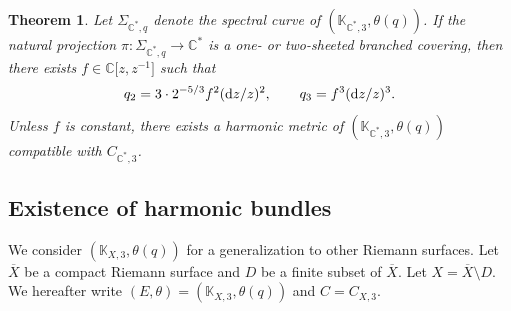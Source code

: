 \documentclass[10pt,a4paper]{amsart}
\numberwithin{equation}{section}
\newtheorem{Theorem}{Theorem}[section]
\newcommand{\C}{\mathbb{C}}
\begin{document}
\begin{Theorem}\label{main_Cstar'}
 Let $\Sigma_{\C^*,q}$ denote the spectral curve of $(\mathbb{K}_{\C^*,3},\theta(q))$.
 If the natural projection $\pi\colon \Sigma_{\C^*,q}\to \C^*$ is a one- or two-sheeted branched covering, then there exists $f\in \C\bigl[z,z^{-1}\bigr]$ such that
 \begin{equation*}
 q_2 = 3\cdot 2^{-5/3}f^2 ({\rm d}z/z)^2, \qquad q_3 = f^3 ({\rm d}z/z)^3.
 \end{equation*}
 Unless $f$ is constant, there exists a harmonic metric of $(\mathbb{K}_{\C^*,3},\theta(q))$ compatible with $C_{\C^*,3}$.
\end{Theorem}


\subsection{Existence of harmonic bundles}\label{subsection_existence}
We consider $(\mathbb{K}_{X,3},\theta(q))$ for a generalization to other Riemann surfaces.
Let $\overline{X}$ be a compact Riemann surface and $D$ be a finite subset of $\overline{X}$. Let $X=\overline{X}\setminus D$.
We hereafter write ${(E,\theta) = (\mathbb{K}_{X,3},\theta(q))}$ and $C=C_{X,3}$.
\end{document}
